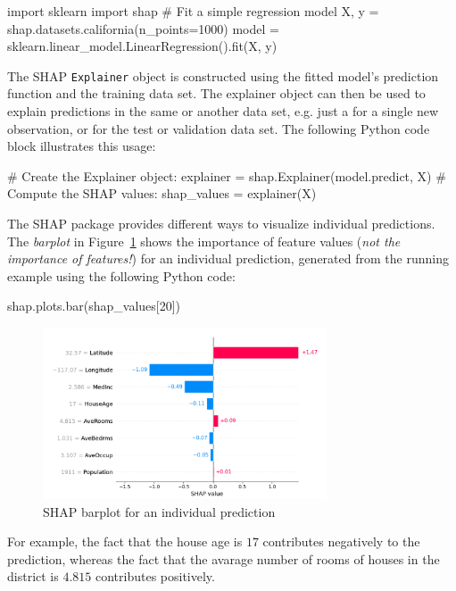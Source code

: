 \begin{samepage}
\begin{pythoncode}
import sklearn
import shap
# Fit a simple regression model
X, y = shap.datasets.california(n_points=1000)
model = sklearn.linear_model.LinearRegression().fit(X, y)
\end{pythoncode}
\end{samepage}

The SHAP \texttt{Explainer} object is constructed using the fitted model's prediction function and the training data set. The explainer object can then be used to explain predictions in the same or another data set, e.g. just a for a single new observation, or for the test or validation data set. The following Python code block illustrates this usage:

\begin{samepage}
\begin{pythoncode}
# Create the Explainer object:
explainer = shap.Explainer(model.predict, X)
# Compute the SHAP values:
shap_values = explainer(X)
\end{pythoncode}
\end{samepage}


The SHAP package provides different ways to visualize individual predictions. The \emph{barplot} in Figure~\ref{fig:shapbar1} shows the importance of feature values (\emph{not the importance of features!}) for an individual prediction, generated from the running example using the following Python code:

\begin{pythoncode}
shap.plots.bar(shap_values[20])
\end{pythoncode}

\begin{figure}
\centering

\includegraphics[height=2in]{shap_barplot1.png}
\caption{SHAP barplot for an individual prediction}
\label{fig:shapbar1}
\end{figure}

For example, the fact that the house age is $17$ contributes negatively to the prediction, whereas the fact that the avarage number of rooms of houses in the district is $4.815$ contributes positively.

